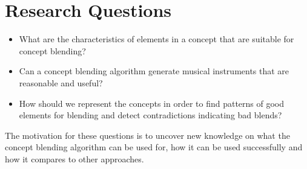 
\section{Research Questions}
\begin{itemize}
\item What are the characteristics of elements in a concept that are suitable for concept blending?
\item Can a concept blending algorithm generate musical instruments that are reasonable and useful?
\item How should we represent the concepts in order to find patterns of good elements for blending and detect contradictions indicating bad blends?
\end{itemize}
The motivation for these questions is to uncover new knowledge on what the concept blending algorithm can be used for, how it can be used successfully and how it compares to other approaches.


